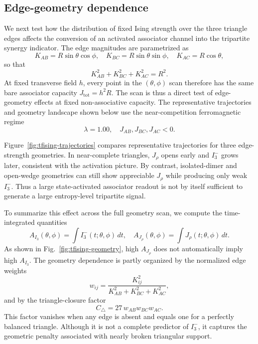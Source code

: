 \documentclass[aps,physrev,preprint,groupedaddress]{revtex4-2}
\begin{document}
\subsection{Edge-geometry dependence}\label{sm:tfising-geometry}
We next test how the distribution of fixed Ising strength over the three triangle edges affects the conversion of an activated associator channel into the tripartite synergy indicator. The edge magnitudes are parametrized as
\begin{equation}
    K_{AB}=R\sin\theta\cos\phi,\quad K_{BC}=R\sin\theta\sin\phi,\quad K_{AC}=R\cos\theta,
\end{equation}
so that
\begin{equation}
    K_{AB}^2+K_{BC}^2+K_{AC}^2=R^2.
\end{equation}
At fixed transverse field $h$, every point in the $(\theta,\phi)$ scan therefore has the same bare associator capacity $J_{\mathrm{tot}}=h^2R$. The scan is thus a direct test of edge-geometry effects at fixed non-associative capacity. The representative trajectories and geometry landscape shown below use the near-competition ferromagnetic regime
\begin{equation}
    \lambda=1.00,\quad J_{AB},J_{BC},J_{AC}<0.
\end{equation}

Figure~\ref{fig:tfising-trajectories} compares representative trajectories for three edge-strength geometries. In near-complete triangles, $J_\rho$ opens early and $I_3^-$ grows later, consistent with the activation picture. By contrast, isolated-dimer and open-wedge geometries can still show appreciable $J_\rho$ while producing only weak $I_3^-$. Thus a large state-activated associator readout is not by itself sufficient to generate a large entropy-level tripartite signal.

To summarize this effect across the full geometry scan, we compute the time-integrated quantities
\begin{equation}
    A_{I_3}(\theta,\phi)=\int I_3^-(t;\theta,\phi)\,dt, \quad
    A_{J_\rho}(\theta,\phi)=\int J_\rho(t;\theta,\phi)\,dt.
\end{equation}
As shown in Fig.~\ref{fig:tfising-geometry}, high $A_{J_\rho}$ does not automatically imply high $A_{I_3}$. The geometry dependence is partly organized by the normalized edge weights
\begin{equation}
    w_{ij}=\frac{K_{ij}^2}{K_{AB}^2+K_{BC}^2+K_{AC}^2},
\end{equation}
and by the triangle-closure factor
\begin{equation}
    C_\triangle=27\,w_{AB}w_{BC}w_{AC}.
\end{equation}
This factor vanishes when any edge is absent and equals one for a perfectly balanced triangle. Although it is not a complete predictor of $I_3^-$, it captures the geometric penalty associated with nearly broken triangular support.
\end{document}

